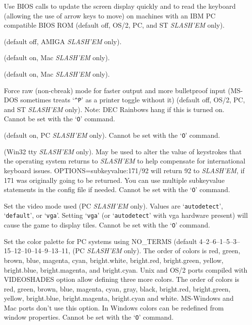 \item[\ib{BIOS}]
Use BIOS calls to update the screen
display quickly and to read the keyboard (allowing the use of arrow
keys to move) on machines with an IBM PC compatible BIOS ROM (default off,
OS/2, PC, and ST {\it SLASH'EM\/} only).

\item[\ib{flush}]
(default off, AMIGA {\it SLASH'EM\/} only).

\item[\ib{MACgraphics}]
(default on, Mac {\it SLASH'EM\/} only).

\item[\ib{page\_wait}]
(default on, Mac {\it SLASH'EM\/} only).

\item[\ib{rawio}]
Force raw (non-cbreak) mode for faster output and more
bulletproof input (MS-DOS sometimes treats `{\tt \^{}P}' as a printer toggle
without it) (default off, OS/2, PC, and ST {\it SLASH'EM\/} only).
Note:  DEC Rainbows hang if this is turned on.
Cannot be set with the `{\tt O}' command.

\item[\ib{soundcard}]
(default on, PC {\it SLASH'EM\/} only).
Cannot be set with the `{\tt O}' command.

\item[\ib{subkeyvalue}]
(Win32 tty {\it SLASH'EM\/} only).
May be used to alter the value of keystrokes that the operating system
returns to {\it SLASH'EM\/} to help compensate for international keyboard issues.
OPTIONS=subkeyvalue:171/92
will return 92 to {\it SLASH'EM}, if 171 was originally going to be returned.
You can use multiple subkeyvalue statements in the config file if needed.
Cannot be set with the `{\tt O}' command.

\item[\ib{video}]
Set the video mode used (PC {\it SLASH'EM\/} only).
Values are `{\tt autodetect}', `{\tt default}', or `{\tt vga}'.
Setting `{\tt vga}' (or `{\tt autodetect}' with vga hardware present) will cause
the game to display tiles. 
Cannot be set with the `{\tt O}' command.

\item[\ib{videocolors}]
Set the color palette for PC systems using NO\_TERMS
(default 4--2--6--1--5--3--15--12--10--14--9--13--11, (PC {\it SLASH'EM\/} only).
The order of colors is red, green, brown, blue, magenta, cyan,
bright.white, bright.red, bright.green, yellow, bright.blue,
bright.magenta, and bright.cyan.
Unix and OS/2 ports compiled with VIDEOSHADES option allow defining 
three more colors. The order of colors is red, green, brown, blue, 
magenta, cyan, gray, black, bright.red, bright.green, yellow, 
bright.blue, bright.magenta, bright.cyan and white.
MS-Windows and Mac ports don't use this option. In Windows colors can be 
redefined from window properties.
Cannot be set with the `{\tt O}' command.

